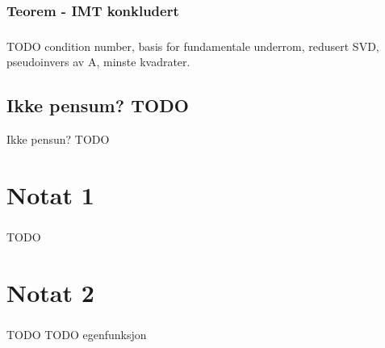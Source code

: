 \documentclass{article}
\begin{document}
      \subsubsection{Teorem - IMT konkludert}
        
      \subsubsection{}
        TODO condition number, basis for fundamentale underrom,
             redusert SVD, pseudoinvers av A, minste kvadrater.
    \subsection{Ikke pensum? TODO}
      Ikke pensun? TODO
  \section{Notat 1}
    \subsubsection{}
      TODO
  \section{Notat 2}
    \subsubsection{}
      TODO
  TODO egenfunksjon
\end{document}
